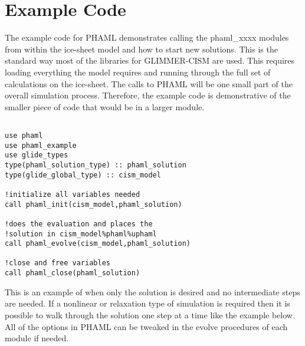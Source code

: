 \section{Example Code}\label{sec:examplecode}

The example code for PHAML demonstrates calling the phaml\_xxxx modules from within the ice-sheet model and how to start new solutions.  This is the standard way most of the libraries for GLIMMER-CISM are used.  This requires loading everything the model requires and running through the full set of calculations on the ice-sheet.  The calls to PHAML will be one small part of the overall simulation process.  Therefore, the example code is demonstrative of the smaller piece of code that would be in a larger module.


\begin{framecode}{6in}
\begin{verbatim}

use phaml
use phaml_example
use glide_types
type(phaml_solution_type) :: phaml_solution
type(glide_global_type) :: cism_model

!initialize all variables needed
call phaml_init(cism_model,phaml_solution)

!does the evaluation and places the 
!solution in cism_model%phaml%uphaml
call phaml_evolve(cism_model,phaml_solution)

!close and free variables
call phaml_close(phaml_solution)

\end{verbatim}
\end{framecode}

This is an example of when only the solution is desired and no intermediate steps are needed.  If a nonlinear or relaxation type of simulation is required then it is possible to walk through the solution one step at a time like the example below.  All of the options in PHAML can be tweaked in the evolve procedures of each module if needed.

